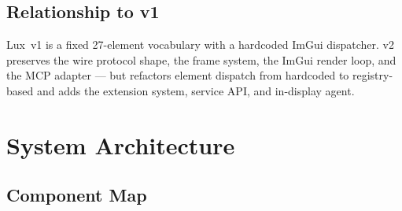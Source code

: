 \documentclass[a4paper,10pt]{article}
\begin{document}
\subsection{Relationship to v1}

Lux~v1 is a fixed 27-element vocabulary with a hardcoded ImGui
dispatcher.  v2 preserves the wire protocol shape, the frame system,
the ImGui render loop, and the MCP adapter --- but refactors element
dispatch from hardcoded to registry-based and adds the extension
system, service API, and in-display agent.

\section{System Architecture}

\subsection{Component Map}
\end{document}
